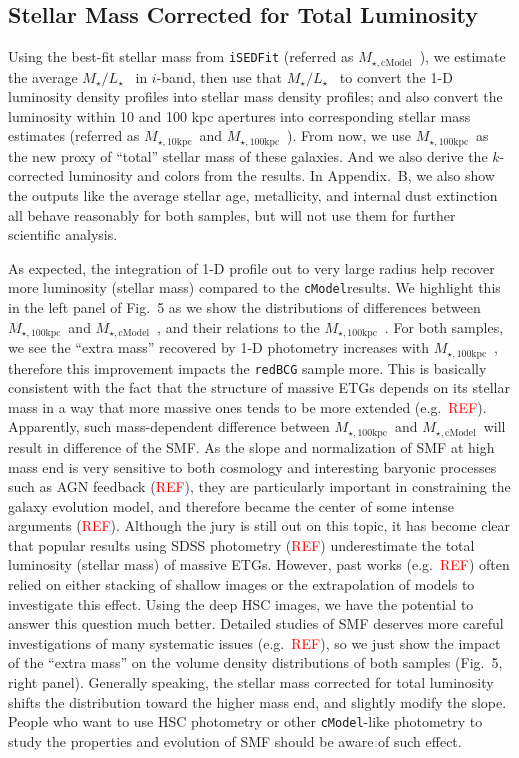 \documentclass[preprint]{aastex}
\def\cmodel{\texttt{cModel}}
\def\mcmodel{{$M_{\star,\mathrm{cModel}}$}~}
\def\mtot{{$M_{\star,100\mathrm{kpc}}$}~}
\def\minn{{$M_{\star,10\mathrm{kpc}}$}~}
\def\m2l{{$M_{\star}/L_{\star}$}~}
\newcommand{\addref}{{\textcolor{red}{REF}}}
\begin{document}
\begin{CJK*}{UTF8}{gbsn}
\subsection{Stellar Mass Corrected for Total Luminosity}
    
    Using the best-fit stellar mass from \texttt{iSEDFit} (referred as \mcmodel), 
    we estimate the average \m2l in $i$-band, then use that \m2l to convert the 
    1-D luminosity density profiles into stellar mass density profiles; and 
    also convert the luminosity within 10 and 100 kpc apertures into 
    corresponding stellar mass estimates (referred as \minn and \mtot). 
    From now, we use \mtot as the new proxy of ``total'' stellar mass of these 
    galaxies.  
    And we also derive the $k$-corrected luminosity and colors from the results.
    In Appendix.~B, we also show the outputs like the average stellar age, 
    metallicity, and internal dust extinction all behave reasonably for both 
    samples, but will not use them for further scientific analysis. 
    
    As expected, the integration of 1-D profile out to very large radius help 
    recover more luminosity (stellar mass) compared to the \cmodel results.
    We highlight this in the left panel of Fig.~5 as we show the distributions 
    of differences between \mtot and \mcmodel, and their relations to the \mtot.  
    For both samples, we see the ``extra mass'' recovered by 1-D photometry 
    increases with \mtot, therefore this improvement impacts the \texttt{redBCG}
    sample more.  
    This is basically consistent with the fact that the structure of massive ETGs 
    depends on its stellar mass in a way that more massive ones tends to be 
    more extended (e.g.\ \addref).  
    Apparently, such mass-dependent difference between \mtot and \mcmodel will 
    result in difference of the SMF. 
    As the slope and normalization of SMF at high mass end is very sensitive 
    to both cosmology and interesting baryonic processes such as AGN feedback
    (\addref), they are particularly important in constraining the galaxy evolution
    model, and therefore became the center of some intense arguments (\addref).  
    Although the jury is still out on this topic, it has become clear that 
    popular results using SDSS photometry (\addref) underestimate the total 
    luminosity (stellar mass) of massive ETGs.  
    However, past works (e.g.\ \addref) often relied on either stacking of 
    shallow images or the extrapolation of models to investigate this effect. 
    Using the deep HSC images, we have the potential to answer this question 
    much better. 
    Detailed studies of SMF deserves more careful investigations of many 
    systematic issues (e.g.\ \addref), so we just show the impact of the 
    ``extra mass'' on the volume density distributions of both samples 
    (Fig.~5, right panel).  
    Generally speaking, the stellar mass corrected for total luminosity 
    shifts the distribution toward the higher mass end, and slightly modify
    the slope. 
    People who want to use HSC photometry or other \cmodel-like photometry to 
    study the properties and evolution of SMF should be aware of such effect.
        

\end{CJK*}
\end{document}
